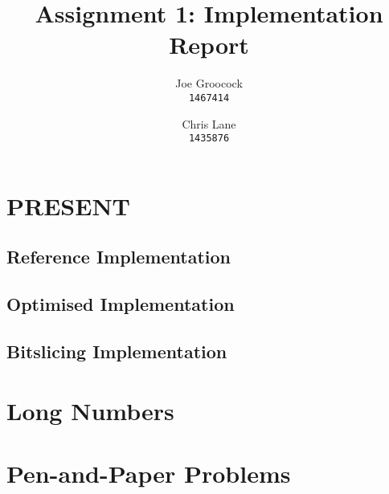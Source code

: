 \documentclass[11pt, a4paper]{article}
\title{Assignment 1: Implementation Report}
\author{Joe Groocock    \\ \texttt{\normalsize 1467414}
    \and Chris Lane     \\ \texttt{\normalsize 1435876}
}
\begin{document}
\maketitle

\section{PRESENT}\label{sec:present}
\subsection{Reference Implementation}\label{subsec:referenceImplementation}

\subsection{Optimised Implementation}\label{subsec:optimisedImplementation}




\subsection{Bitslicing Implementation}\label{subsec:bitslicingImplementation}





\section{Long Numbers}\label{sec:longnumbers}

\section{Pen-and-Paper Problems}\label{sec:penandpaperproblems}
\end{document}
